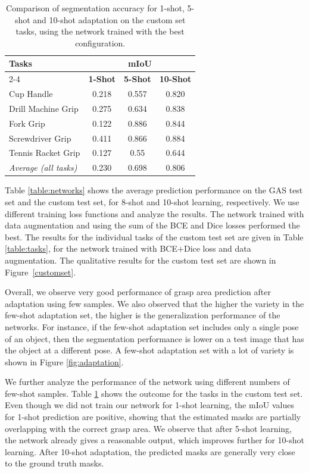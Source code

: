 \documentclass[letterpaper]{article} %
\begin{document}
\begin{table}[h!]
\centering
\caption{Comparison of segmentation accuracy for 1-shot, 5-shot and 10-shot adaptation on the custom set tasks, using the network trained with the best configuration.}
\begin{tabular}{|p{3.3cm}|c|c|c|}
 \hline
 \multirow{2}{*}{\textbf{Tasks}} & \multicolumn{3}{c|}{\textbf{mIoU}} \\ \cline{2-4}
 & \textbf{1-Shot}  & \textbf{5-Shot} & \textbf{10-Shot} \\
 \hline
 Cup Handle & 0.218 & 0.557 & 0.820 \\
 \hline
 Drill Machine Grip & 0.275 & 0.634 & 0.838 \\
 \hline
 Fork Grip & 0.122 & 0.886 & 0.844 \\
 \hline
 Screwdriver Grip & 0.411 & 0.866 & 0.884\\
 \hline
 Tennis Racket Grip & 0.127 & 0.55 & 0.644 \\
 \hline
 \textit{Average (all tasks)} & 0.230 & 0.698 & 0.806 \\
 \hline
\end{tabular}
\label{table:shots}
\end{table}

Table \ref{table:networks} shows the average prediction performance on the GAS test set and the custom test set,  for 8-shot and 10-shot learning, respectively. We use different training loss functions and analyze the results. The network trained with data augmentation and using the sum of the BCE and Dice losses performed the best. The results for the individual tasks of the custom test set are given in Table \ref{table:tasks}, for the network trained with BCE$ + $Dice loss and data augmentation. The qualitative results for the custom test set are shown in Figure~\ref{customset}.

Overall, we observe very good performance of grasp area prediction after adaptation using few samples. We also observed that the higher the variety in the few-shot adaptation set, the higher is the generalization performance of the networks. For instance, if the few-shot adaptation set includes only a single pose of an object, then the segmentation performance is lower on a test image that has the object at a different pose. A few-shot adaptation set with a lot of variety is shown in Figure \ref{fig:adaptation}.

We further analyze the performance of the network using different numbers of few-shot samples. Table \ref{table:shots} shows the outcome for the tasks in the custom test set. Even though we did not train our network for 1-shot learning, the mIoU values for 1-shot prediction are positive, showing that the estimated masks are partially overlapping with the correct grasp area. We observe that after 5-shot learning, the network already gives a reasonable output, which improves further for 10-shot learning. After 10-shot adaptation, the predicted masks are generally very close to the ground truth masks.
\end{document}
